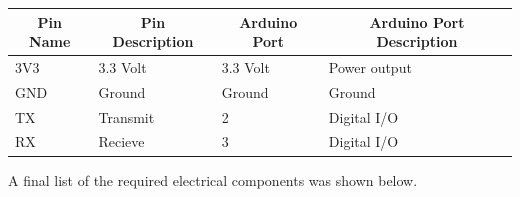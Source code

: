 \documentclass[12pt, titlepage]{article}
\begin{document}
\begin{table}[H]
  \centering
  \begin{tabular}{|p{2cm}|p{6cm}|p{2cm}|p{2cm}|}
  \hline
  \multicolumn{1}{|c|}{\textbf{Pin Name}} & \multicolumn{1}{c|}{\textbf{Pin Description}} & \multicolumn{1}{|c|}{\textbf{Arduino Port}} & \multicolumn{1}{|c|}{\textbf{Arduino Port Description}} 
  \\ \hline
  3V3
  & 3.3 Volt
  & 3.3 Volt
  & Power output
  \newline                                
  \\ \hline

  GND                              
  & Ground
  & Ground
  & Ground
  \newline                                
  \\ \hline

  TX                          
  & Transmit
  & 2
  & Digital I/O
  \newline                                
  \\ \hline

  RX                                
  & Recieve
  & 3
  & Digital I/O
  \newline                            
  \\ \hline


  \end{tabular}
\end{table}


\newpage

A final list of the required electrical components was shown below. \\
\end{document}
